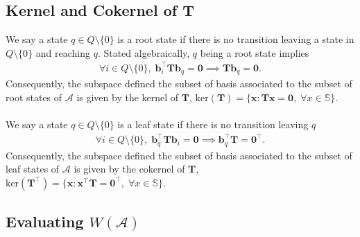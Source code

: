 \subsection{Kernel and Cokernel of $\mathbf{T}$}

We say a state $q \in Q \setminus \{0\} $ is a root state if there is no transition leaving a state in $Q \setminus \{0\}$ and reaching $q$. Stated algebraically, $q$ being a root state implies
\begin{align}
    \forall i \in Q \setminus \{0\}, \;\mathbf{b}_i^\top \mathbf{T} \mathbf{b}_q = \mathbf{0} \implies \mathbf{T} \mathbf{b}_q = \mathbf{0}.
\end{align}
Consequently, the subspace defined the subset of basis associated to the subset of root states of $\mathcal{A}$ is given by the kernel of $\mathbf{T}$, $\text{ker}(\mathbf{T}) = \{ \mathbf{x} : \mathbf{T} \mathbf{x} = \mathbf{0},\; \forall x \in \mathbb{S}\}$. 

\paragraph{} We say a state $q \in Q \setminus \{0\} $ is a leaf state if there is no transition leaving $q$
\begin{align}
    \forall i \in Q \setminus \{0\}, \;\mathbf{b}_q^\top \mathbf{T} \mathbf{b}_i = \mathbf{0} \implies \mathbf{b}_q^\top \mathbf{T} = \mathbf{0}^\top.
\end{align}
Consequently, the subspace defined the subset of basis associated to the subset of leaf states of $\mathcal{A}$ is given by the cokernel of $\mathbf{T}$, $\text{ker}(\mathbf{T}^\top) = \{ \mathbf{x} : \mathbf{x}^\top \mathbf{T} = \mathbf{0}^\top,\; \forall x \in \mathbb{S}\}$. 

\subsection{Evaluating $W(\mathcal{A})$}

